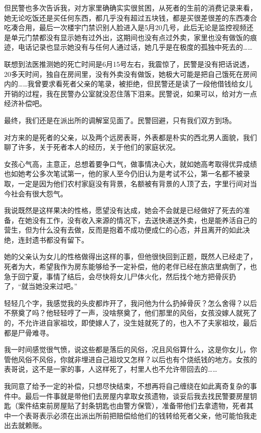 但民警也多次告诉我，对方家里确确实实很贫困，从死者的生前的消费记录来看，她无论吃饭还是买任何东西，都几乎没有超过五块钱，都是买很差很差的东西凑合吃凑合用，最后一次楼宇门禁识别人脸进入是5月20几号，此后无论是监控视频还是单元门禁都没有显示她有过外出，这期间也没有点过外卖，家里也没有做饭的痕迹，电话记录也显示她没有与任何人通过话，她几乎是在极度的孤独中死去的……

联想到法医推测她的死亡时间是6月15号左右，我震惊了，民警是没有把话说透，20多天时间，独自在房间里，没有外卖没有做饭，她极大可能是把自己饿死在房间内的……我曾要求看死者父亲的笔录，被拒绝，但民警还是读了一段他借钱给女儿开销的过程，我在民警办公室就没忍住落下泪来。民警说，如果可以，给对方一点经济补偿吧。

最终，我们还是在派出所的调解室见面了。民警回避，只有我们双方到场。

对方来的是死者的父亲，以及两个远房表哥，外表都是朴实的西北男人面貌，我们聊了许多，关于死者本人的经历，关于他们的家庭状况。

女孩心气高，主意正，总想着要争口气，做事情决心大，就如她高考取得优异成绩也如她考公多次笔试第一，他的家人至今仍旧认为是考试不公，第一名都不被录取，一定是因为他们农村家庭没有背景，名额被有背景的人顶了去，字里行间对当今社会有很大怨气。

我说既然是这样果决的性格，愿望没有达成，她会不会就是已经做好了死去的准备，在她没有工作，没有收入来源的情况下，去送快递送外卖，也是能养活自己的营生，但为什么没有去做，反而是抱着不成功便成仁的心态，并且离开的如此决绝，连封遗书都没有留下。

她的父亲认为女儿的性格做得出这样的事，但他很快回到正题，既然人已经走了，死者为大，希望我作为房东能够给予一定补偿，他的老伴已经在旅店里病倒了，也急于回宁夏，事情了结后，会尽快将女儿尸体火化，然后找个地方把骨灰扔了，“就当她没来过吧。”

轻轻几个字，我感觉我的头皮都炸开了，我问他为什么扔掉骨灰？怎么舍得？以后不祭奠了吗？他轻轻哼了一声，没啥祭奠了，他们那里的风俗，女孩没嫁人就死了的，不允许进自家祖坟，即使嫁人了，没生娃就死了的，也入不了夫家祖坟，最后都是尸骨难寻。

我一时间感觉很气愤，说这些都是落后的风俗，况且风俗算什么，这是你女儿，你管他风俗不风俗，你就非埋进自己祖坟又怎样？以后也有个烧纸钱的地方。女孩的表哥说，这不是一家的事，人这样死了，村里人也不允许带回去的……

我同意了给予一定的补偿，只想尽快结束，不想再将自己缠绕在如此离奇复杂的事件中。最后一件事就是带他们去房屋内拿取女孩遗物，谈妥后我去找民警要房屋钥匙（案件结束前房屋贴了封条钥匙也由警方保管），准备带他们去拿遗物，死者其中一个表哥表示必须在出派出所前把赔偿给他们的钱转给死者父亲，他可能怕我走出去就赖账。

